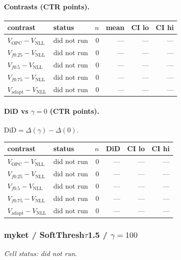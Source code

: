 \documentclass[10pt,a4paper]{article}
\begin{document}
\paragraph{Contrasts (CTR points).}
{\centering\small\begin{tabular}{llrrrr}
\toprule contrast & status & $n$ & mean & CI lo & CI hi \\
\midrule
$V_{\mathrm{OPC}}-V_{\mathrm{NLL}}$ & did not run & 0 & --- & --- & --- \\
$V_{f0.25}-V_{\mathrm{NLL}}$ & did not run & 0 & --- & --- & --- \\
$V_{f0.5}-V_{\mathrm{NLL}}$ & did not run & 0 & --- & --- & --- \\
$V_{f0.75}-V_{\mathrm{NLL}}$ & did not run & 0 & --- & --- & --- \\
$V_{\mathrm{adapt}}-V_{\mathrm{NLL}}$ & did not run & 0 & --- & --- & --- \\
\bottomrule\end{tabular}\par}
\paragraph{DiD vs $\gamma=0$ (CTR points).} $\mathrm{DiD}=\Delta(\gamma)-\Delta(0)$.
{\centering\small\begin{tabular}{llrrrr}
\toprule contrast & status & $n$ & DiD & CI lo & CI hi \\
\midrule
$V_{\mathrm{OPC}}-V_{\mathrm{NLL}}$ & did not run & 0 & --- & --- & --- \\
$V_{f0.25}-V_{\mathrm{NLL}}$ & did not run & 0 & --- & --- & --- \\
$V_{f0.5}-V_{\mathrm{NLL}}$ & did not run & 0 & --- & --- & --- \\
$V_{f0.75}-V_{\mathrm{NLL}}$ & did not run & 0 & --- & --- & --- \\
$V_{\mathrm{adapt}}-V_{\mathrm{NLL}}$ & did not run & 0 & --- & --- & --- \\
\bottomrule\end{tabular}\par}
\bigskip
\subsubsection{myket / SoftThresh$\tau$1.5 / $\gamma=100$}
\emph{Cell status: did not run}.
\end{document}
